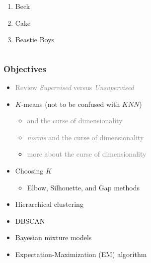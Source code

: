 \documentclass[xcolor={dvipsnames}]{beamer}
\begin{document}
{\begin{columns}
\begin{column}{.55\textwidth}
 \begin{enumerate}
 \item Beck
\item Cake
\item Beastie Boys
\end{enumerate}

\end{column}
\end{columns}


}



\frame
{
 \frametitle{Objectives}
\begin{itemize}
\item \textcolor{gray}{Review \emph{Supervised} versus \emph{Unsupervised}}
\item $K$-means (not to be confused with $KNN$)
\begin{itemize}
\item \textcolor{gray}{and the curse of dimensionality}
\item \textcolor{gray}{\emph{norms} and the curse of dimensionality}
\item \textcolor{gray}{more about the curse of dimensionality}
\end{itemize}
\item Choosing $K$
\begin{itemize}
\item Elbow, Silhouette, and Gap methods
\end{itemize}
\item Hierarchical clustering
\item DBSCAN  
\item Bayesian mixture models
\item Expectation-Maximization (EM) algorithm  
 \end{itemize}

}
\end{document}
